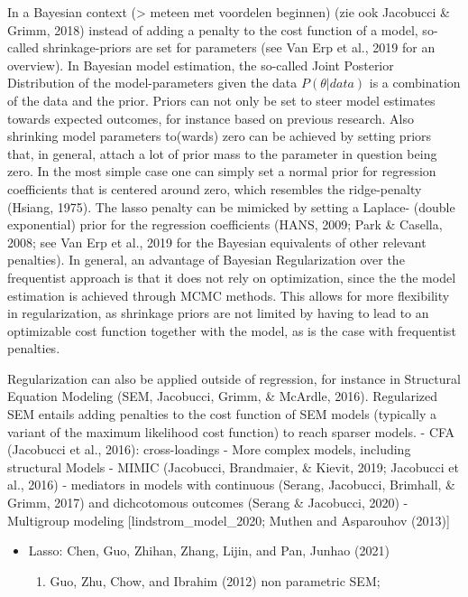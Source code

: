 \documentclass[
  english,
  man, donotrepeattitle,floatsintext]{apa6}
\providecommand{\tightlist}{%
  \setlength{\itemsep}{0pt}\setlength{\parskip}{0pt}}
\begin{document}
In a Bayesian context (\textgreater{} meteen met voordelen beginnen) (zie ook Jacobucci \& Grimm, 2018) instead of adding a penalty to the cost function of a model, so-called shrinkage-priors are set for parameters (see Van Erp et al., 2019 for an overview). In Bayesian model estimation, the so-called Joint Posterior Distribution of the model-parameters given the data \(P({\theta} | data)\) is a combination of the data and the prior. Priors can not only be set to steer model estimates towards expected outcomes, for instance based on previous research. Also shrinking model parameters to(wards) zero can be achieved by setting priors that, in general, attach a lot of prior mass to the parameter in question being zero. In the most simple case one can simply set a normal prior for regression coefficients that is centered around zero, which resembles the ridge-penalty (Hsiang, 1975). The lasso penalty can be mimicked by setting a Laplace- (double exponential) prior for the regression coefficients (HANS, 2009; Park \& Casella, 2008; see Van Erp et al., 2019 for the Bayesian equivalents of other relevant penalties). In general, an advantage of Bayesian Regularization over the frequentist approach is that it does not rely on optimization, since the the model estimation is achieved through MCMC methods. This allows for more flexibility in regularization, as shrinkage priors are not limited by having to lead to an optimizable cost function together with the model, as is the case with frequentist penalties.

Regularization can also be applied outside of regression, for instance in Structural Equation Modeling (SEM, Jacobucci, Grimm, \& McArdle, 2016). Regularized SEM entails adding penalties to the cost function of SEM models (typically a variant of the maximum likelihood cost function) to reach sparser models.
- CFA (Jacobucci et al., 2016): cross-loadings
- More complex models, including structural Models - MIMIC (Jacobucci, Brandmaier, \& Kievit, 2019; Jacobucci et al., 2016)
- mediators in models with continuous (Serang, Jacobucci, Brimhall, \& Grimm, 2017) and dichcotomous outcomes (Serang \& Jacobucci, 2020)
- Multigroup modeling {[}lindstrom\_model\_2020; Muthen and Asparouhov (2013){]}

\begin{itemize}
\tightlist
\item
  Lasso:
  Chen, Guo, Zhihan, Zhang, Lijin, and Pan, Junhao (2021)

  \begin{enumerate}
  \def\labelenumi{\arabic{enumi}.}
  \tightlist
  \item
    Guo, Zhu, Chow, and Ibrahim (2012) non parametric SEM;
  \end{enumerate}
\end{itemize}
\end{document}
